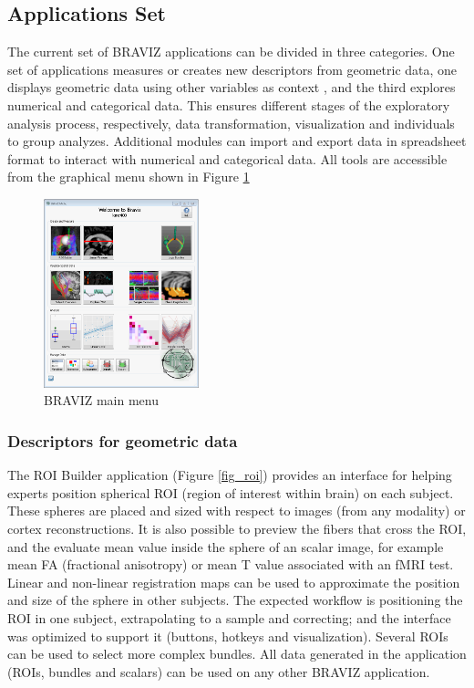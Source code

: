 \documentclass[twocolumn]{svjour3}
\begin{document}
\subsection{Applications Set}


The current set of BRAVIZ applications can be divided in three categories. One set of applications measures or creates new descriptors from geometric data, one displays geometric data using other variables as context , and the third explores numerical and categorical data. This ensures different stages of the exploratory analysis process, respectively, data transformation, visualization and individuals to group analyzes. Additional modules can import and export data in spreadsheet format to interact with numerical and categorical data. All tools  are accessible from the graphical menu shown in Figure \ref{fig_menu}

\begin{figure}
\begin{center}
\includegraphics[width=0.4\textwidth]{figures/braviz_menu.PNG}
\end{center}
 \caption{\label{fig_menu} BRAVIZ main menu }
\end{figure}


\subsubsection{Descriptors for geometric data}

The ROI Builder application (Figure \ref{fig_roi}) provides an interface for helping experts position spherical ROI  (region of interest within brain) on each subject. These spheres are placed and sized with respect to images (from any modality) or cortex reconstructions. It is also possible to preview the fibers that cross the ROI, and the evaluate mean value inside the sphere of an scalar image, for example mean FA (fractional anisotropy) or mean T value associated with an fMRI test. 
Linear and non-linear registration maps can be used to approximate the position and size of the sphere in other subjects. The expected workflow is positioning the ROI in one subject, extrapolating to a sample and correcting; and the interface was optimized to support it (buttons, hotkeys and visualization). Several ROIs can be used to select more complex bundles. All data generated in the application (ROIs, bundles and scalars) can be used on any other BRAVIZ application. 
\end{document}
